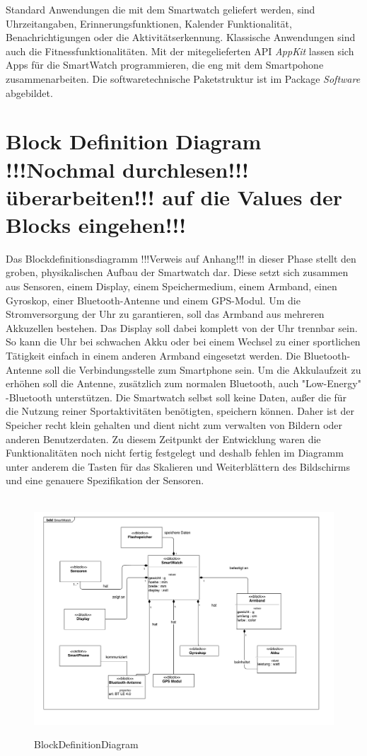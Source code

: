 Standard Anwendungen die mit dem Smartwatch geliefert werden, sind Uhrzeitangaben, Erinnerungsfunktionen, Kalender Funktionalität, Benachrichtigungen oder die Aktivitätserkennung. Klassische Anwendungen sind auch die Fitnessfunktionalitäten.
Mit der mitegelieferten API \textit{AppKit} lassen sich Apps für die SmartWatch programmieren, die eng mit dem Smartpohone zusammenarbeiten.
Die softwaretechnische Paketstruktur ist im Package \textit{Software} abgebildet.

\section{Block Definition Diagram !!!Nochmal durchlesen!!!überarbeiten!!! auf die Values der Blocks eingehen!!!}

Das Blockdefinitionsdiagramm !!!Verweis auf Anhang!!! in dieser Phase stellt den groben, physikalischen Aufbau der Smartwatch dar. Diese setzt sich zusammen aus Sensoren, einem Display, einem Speichermedium, einem Armband, einen Gyroskop, einer Bluetooth-Antenne und einem GPS-Modul. Um die Stromversorgung der Uhr zu garantieren, soll das Armband aus mehreren Akkuzellen bestehen. Das Display soll dabei komplett von der Uhr trennbar sein. So kann die Uhr bei schwachen Akku oder bei einem Wechsel zu einer sportlichen Tätigkeit einfach in einem anderen Armband eingesetzt werden. Die Bluetooth-Antenne soll die Verbindungsstelle zum Smartphone sein. Um die Akkulaufzeit zu erhöhen soll die Antenne, zusätzlich zum normalen Bluetooth, auch "Low-Energy" -Bluetooth unterstützen. Die Smartwatch selbst soll keine Daten, außer die für die Nutzung reiner Sportaktivitäten benötigten, speichern können. Daher ist der Speicher recht klein gehalten und dient nicht zum verwalten von Bildern oder anderen Benutzerdaten. 
Zu diesem Zeitpunkt der Entwicklung waren die Funktionalitäten noch nicht fertig festgelegt und deshalb fehlen im Diagramm unter anderem die Tasten für das Skalieren und Weiterblättern des Bildschirms und eine genauere Spezifikation der Sensoren. 

\begin{figure}[htb]
\centering\
\includegraphics[width=\textwidth]{img/block1}
\caption{BlockDefinitionDiagram}\label{fig:block1}
\end{figure}

